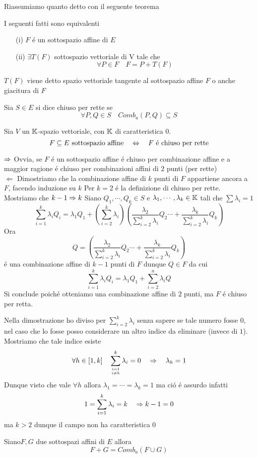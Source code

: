 \newpage
Riassumiamo quanto detto con il seguente teorema
\begin{thm}I seguenti fatti sono equivalenti
\begin{itemize}
\item[(i)]$F$ \'e un sottospazio affine di $E$
\item[(ii)]$\exists T(F) $ sottospazio vettoriale di V tale che 
$$ \forall P \in F \quad F = P + T(F) $$
\end{itemize}
$T(F)$ viene detto spazio vettoriale tangente al sottospazio affine $F$ o anche giacitura di $F$ 
\end{thm}
\spazio
\begin{defn}Sia $S \in E$ si dice chiuso per rette se 
$$ \forall P,Q \in S \quad Comb_a(P,Q) \subseteq S $$
\end{defn}
\begin{prop}Sia $V$ un $\mathbb{K}$-spazio vettoriale, con $\mathbb{K}$ di caratteristica $0$.
$$F \subseteq E \text{ sottospazio affine} \quad \Leftrightarrow \quad F \text{ \'e chiuso per rette}$$

\proof $\Rightarrow $ Ovvia, se $F$ \'e un sottospazio affine \'e chiuso per combinazione affine e a maggior ragione \'e chiuso per combinazioni affini di $2$ punti (per rette)\\

$\Leftarrow$ Dimostriamo  che la combinazione affine di $k$ punti di $F$ appartiene ancora a $F$, facendo induzione su $k$ 
Per $k=2$ \'e la definizione di chiuso per rette.\\
Mostriamo che $k-1\Rightarrow k$
Siano $Q_1, \cdots , Q_k \in S$ e $\lambda_1, \cdots , \lambda_k \in \mathbb{K} $ tali che $\sum \lambda_i = 1 $ 
$$ \sum_{i=1}^k \lambda_i Q_i = \lambda_1 Q_1 + 
\left( \sum_{i=2}^k \lambda_i \right)
 \left( \frac{\lambda_2}{\sum_{i=2}^k \lambda_i} Q_2 \cdots + \frac{\lambda_k}{\sum_{i=2}^k \lambda_i} Q_k\right)$$
 Ora 
 $$ Q=\left( \frac{\lambda_2}{\sum_{i=2}^k \lambda_i} Q_2 \cdots + \frac{\lambda_k}{\sum_{i=2}^k \lambda_i} Q_k\right)$$ 
 \'e una combinazione affine di $k-1$ punti di $F$ dunque $Q\in F $ da cui
 $$ \sum_{i=1}^k \lambda_i Q_i = \lambda_1 Q_1 + \sum_{i=2}^n\lambda_i Q $$
 Si conclude poich\'e otteniamo una combinazione affine di $2$ punti, ma $F$ \'e chiuso per retta.\\
 \begin{oss}Nella dimostrazione ho diviso per  $\sum_{i=2}^k \lambda_i$ senza sapere se tale numero fosse $0$, nel caso che lo fosse posso considerare un altro indice da eliminare (invece di $1$).\\
 Mostriamo che tale indice esiste
 $$ \forall h \in [1,k] \quad \sum_{i=1 \atop{i\neq h }}^k \lambda_i=0 \quad \Rightarrow \quad \lambda_h=1$$
 Dunque visto che vale $\forall h $ allora $\lambda_1= \cdots = \lambda_k = 1 $ ma ci\'o \'e assurdo infatti
 $$ 1= \sum_{i=1}^k \lambda_i = k  \quad \Rightarrow k-1= 0 $$
 ma $k>2$ dunque il campo non ha caratteristica 0 
 \end{oss}
 \endproof
\end{prop}
\begin{defn}\bianco
Siano$ F,G$ due sottospazi affini di $E$ allora
$$ F+G = Comb_a (F \cup G)$$
\end{defn}
\spazio

